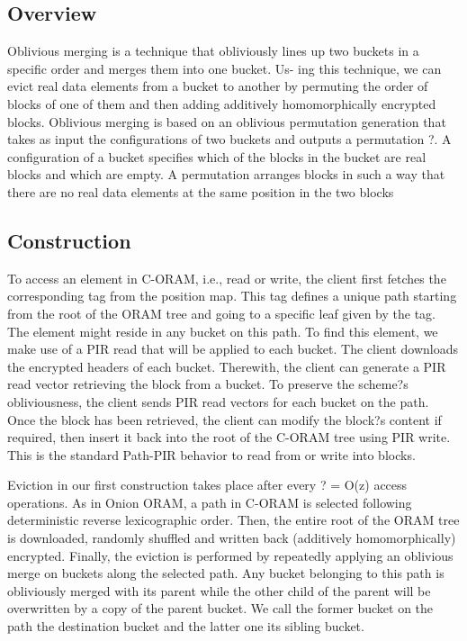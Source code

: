 \documentclass[12pt, oneside]{amsart}   	%
\begin{document}
\subsection{Overview} %
Oblivious merging is a technique that obliviously lines up two buckets in a specific order and merges them into one bucket. Us- ing this technique, we can evict real data elements from a bucket to another by permuting the order of blocks of one of them and then adding additively homomorphically encrypted blocks. Oblivious merging is based on an oblivious permutation generation that takes as input the configurations of two buckets and outputs a permutation ?. A configuration of a bucket specifies which of the blocks in the bucket are real blocks and which are empty. A permutation arranges blocks in such a way that there are no real data elements at the same position in the two blocks 

\subsection{Construction}%
To access an element in C-ORAM, i.e., read or write, the client first fetches the corresponding tag from the position map. This tag defines a unique path starting from the root of the ORAM tree and going to a specific leaf given by the tag. The element might reside in any bucket on this path. To find this element, we make use of a PIR read  that will be applied to each bucket. The client downloads the encrypted headers of each bucket. Therewith, the client can generate a PIR read vector retrieving the block from a bucket. To preserve the scheme?s obliviousness, the client sends PIR read vectors for each bucket on the path. Once the block has been retrieved, the client can modify the block?s content if required, then insert it back into the root of the C-ORAM tree using PIR write. This is the standard Path-PIR behavior to read from or write into blocks.

Eviction in our first construction takes place after every ? = O(z) access operations. As in Onion ORAM, a path in C-ORAM is selected following deterministic reverse lexicographic order. Then, the entire root of the ORAM tree is downloaded, randomly shuffled and written back (additively homomorphically) encrypted. Finally, the eviction is performed by repeatedly applying an oblivious merge on buckets along the selected path. Any bucket belonging to this path is obliviously merged with its parent while the other child of the parent will be overwritten by a copy of the parent bucket. We call the former bucket on the path the destination bucket and the latter one its sibling bucket.
\end{document}
